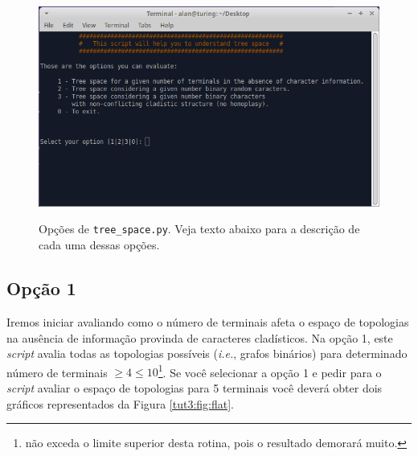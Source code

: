 \begin{refsection}
  \begin{figure}[H]
  \centering
       \centering
      {\includegraphics[scale=0.60]{figures/tut3/tree_space_prompt.png}}
      {\caption[Opções de \texttt{tree\_space.py}]{Opções de \texttt{tree\_space.py}. Veja texto abaixo para a descrição de cada uma dessas opções.}\label{tut3:fig:prompt}}
  \end{figure}


\subsection{Opção 1}\label{tut3:subs:flat}
Iremos iniciar avaliando como o número de terminais afeta o espaço de topologias na ausência de informação provinda de caracteres cladísticos. Na opção 1, este \textit{script} avalia todas as topologias possíveis (\textit{i.e.}, grafos binários) para determinado número de terminais $\ge 4 \le 10$\footnote{não exceda o limite superior desta rotina, pois o resultado demorará muito.}. Se você selecionar a opção 1 e pedir para o \textit{script} avaliar o espaço de topologias para 5 terminais você deverá obter dois gráficos representados da Figura \ref{tut3:fig:flat}.
 


\end{refsection}
